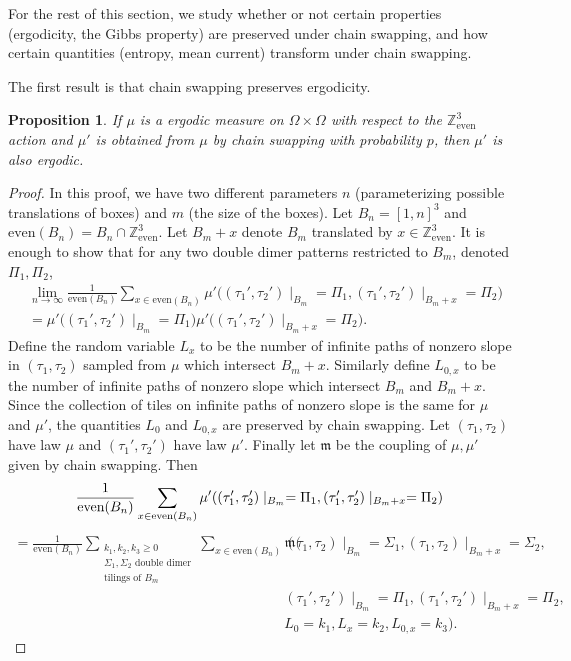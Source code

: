 \documentclass[11pt]{article}
\newtheorem{prop}[thm]{Proposition}
\theoremstyle{remark}
\theoremstyle{definition}
\newcommand{\Z}{\mathbb{Z}}
\newcommand{\threeeven}{\Z^3_{\text{even}}}
\begin{document}
For the rest of this section, we study whether or not certain properties (ergodicity, the Gibbs property) are preserved under chain swapping, and how certain quantities (entropy, mean current) transform under chain swapping. 

The first result is that chain swapping preserves ergodicity. 

\begin{prop}\label{prop:preserve_ergodicity}
If $\mu$ is a ergodic measure on $\Omega\times \Omega$ with respect to the $\threeeven$ action and $\mu'$ is obtained from $\mu$ by chain swapping with probability $p$, then $\mu'$ is also ergodic.
\end{prop}
\begin{proof}
    In this proof, we have two different parameters $n$ (parameterizing possible translations of boxes) and $m$ (the size of the boxes). Let $B_n = [1,n]^3$ and $\text{even}(B_n) = B_n\cap \threeeven$. Let $B_m+x$ denote $B_m$ translated by $x\in \threeeven$. It is enough to show that for any two double dimer patterns restricted to $B_m$, denoted $\Pi_1,\Pi_2$,
    \begin{align*}
        &\lim_{n\to \infty} \frac{1}{\text{even}(B_n)} \sum_{x\in \text{even}(B_n)} \mu'\bigg((\tau_1',\tau_2')\mid_{B_m} = \Pi_1, (\tau_1',\tau_2')\mid_{B_m+x} = \Pi_2\bigg) \\
        &= \mu'\bigg((\tau_1',\tau_2')\mid_{B_m} = \Pi_1\bigg) \mu'\bigg((\tau_1',\tau_2')\mid_{B_m+x} = \Pi_2\bigg).
    \end{align*}
    Define the random variable $L_x$ to be the number of infinite paths of nonzero slope in $(\tau_1, \tau_2)$ sampled from $\mu$ which intersect $B_m + x$. Similarly define $L_{0,x}$ to be the number of infinite paths of nonzero slope which intersect $B_m$ and $B_m+x$. Since the collection of tiles on infinite paths of nonzero slope is the same for $\mu$ and $\mu'$, the quantities $L_0$ and $L_{0,x}$ are preserved by chain swapping. Let $(\tau_1,\tau_2)$ have law $\mu$ and $(\tau_1',\tau_2')$ have law $\mu'$. Finally let $\mathfrak m$ be the coupling of $\mu,\mu'$ given by chain swapping. Then
    $$
        \frac{1}{\text{even}(B_n)} \sum_{x\in \text{even}(B_n)} \mu'((\tau_1',\tau_2')\mid_{B_m} = \Pi_1, (\tau_1',\tau_2')\mid_{B_m+x} = \Pi_2)\\
        $$ 
        \begin{align*}
            = \frac{1}{\text{even}(B_n)} \sum_{\substack{k_1,k_2,k_3 \geq 0 \\ \Sigma_1,\Sigma_2 \text{ double dimer} \\ \text{tilings of }B_m}}  \sum_{x\in \text{even}(B_n)} \mathfrak m\bigg(&(\tau_1,\tau_2)\mid_{B_m} = \Sigma_1, (\tau_1,\tau_2)\mid_{B_m+x} = \Sigma_2, \\
        &(\tau_1',\tau_2')\mid_{B_m} = \Pi_1, (\tau_1',\tau_2')\mid_{B_m+x} =  \Pi_2, \\
        &L_0=k_1, L_x=k_2,
        L_{0,x} = k_3\bigg).
        \end{align*}
       

\end{proof}
\end{document}
